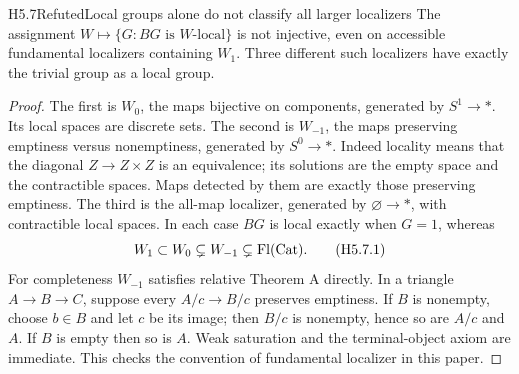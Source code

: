 \begin{claim}{H5.7}{Refuted}{Local groups alone do not classify all larger localizers}
The assignment
$W\mapsto\{G:BG\text{ is }W\text{-local}\}$ is not injective,
even on accessible fundamental localizers containing $W_1$.
Three different such localizers have exactly the trivial
group as a local group.
\end{claim}
\begin{proof}
The first is $W_0$, the maps bijective on components,
generated by $S^1\to *$. Its local spaces are discrete
sets. The second is $W_{-1}$, the maps preserving
emptiness versus nonemptiness, generated by $S^0\to *$.
Indeed locality means that the diagonal
$Z\to Z\times Z$ is an equivalence; its solutions are
the empty space and the contractible spaces. Maps
detected by them are exactly those preserving
emptiness. The third is the all-map localizer,
generated by $\varnothing\to *$, with contractible
local spaces. In each case $BG$ is local exactly when
$G=1$, whereas
\[
 W_1\subset W_0\subsetneq W_{-1}\subsetneq\mathrm{Fl}(\mathrm{Cat}).
                                                        \tag{H5.7.1}
\]
For completeness $W_{-1}$ satisfies relative Theorem A
directly. In a triangle $A\to B\to C$, suppose every
$A/c\to B/c$ preserves emptiness. If $B$ is nonempty,
choose $b\in B$ and let $c$ be its image; then
$B/c$ is nonempty, hence so are $A/c$ and $A$.
If $B$ is empty then so is $A$. Weak saturation and
the terminal-object axiom are immediate. This checks
the convention of fundamental localizer in this paper.
\end{proof}

